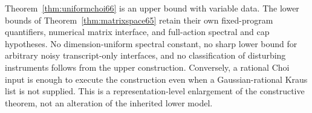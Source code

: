 Theorem~\ref{thm:uniformchoi66} is an upper bound with variable data.
The lower bounds of Theorem~\ref{thm:matrixspace65} retain their own
fixed-program quantifiers, numerical matrix interface, and full-action
spectral and cap hypotheses. No dimension-uniform spectral constant,
no sharp lower bound for arbitrary noisy transcript-only interfaces,
and no classification of disturbing instruments follows from the
upper construction. Conversely, a rational Choi input is enough to
execute the construction even when a Gaussian-rational Kraus list is
not supplied. This is a representation-level enlargement of the
constructive theorem, not an alteration of the inherited lower model.
